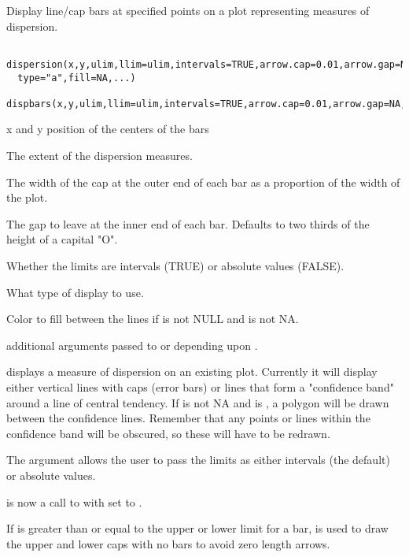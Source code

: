 \begin{Description}\relax
Display line/cap bars at specified points on a plot representing
measures of dispersion.
\end{Description}
\begin{Usage}
\begin{verbatim}
 dispersion(x,y,ulim,llim=ulim,intervals=TRUE,arrow.cap=0.01,arrow.gap=NA,
  type="a",fill=NA,...)
 dispbars(x,y,ulim,llim=ulim,intervals=TRUE,arrow.cap=0.01,arrow.gap=NA,...)
\end{verbatim}
\end{Usage}
\begin{Arguments}
\begin{ldescription}
\item[\code{x,y}] x and y position of the centers of the bars
\item[\code{ulim,llim}] The extent of the dispersion measures.
\item[\code{arrow.cap}] The width of the cap at the outer end of each bar
as a proportion of the width of the plot.
\item[\code{arrow.gap}] The gap to leave at the inner end of each bar.
Defaults to two thirds of the height of a capital "O".
\item[\code{intervals}] Whether the limits are intervals (TRUE) or absolute values
(FALSE).
\item[\code{type}] What type of display to use.
\item[\code{fill}] Color to fill between the lines if  is not NULL and
 is not NA.
\item[\code{...}] additional arguments passed to  or 
depending upon .
\end{ldescription}
\end{Arguments}
\begin{Details}\relax
{} displays a measure of dispersion on an existing plot.
Currently it will display either vertical lines with caps (error bars) or lines
that form a "confidence band" around a line of central tendency. If 
is not NA and  is , a polygon will be drawn between the
confidence lines. Remember that any points or lines within the confidence band
will be obscured, so these will have to be redrawn.

The  argument allows the user to pass the limits as either intervals (the default) or absolute values.

 is now a call to  with  set to
.

If  is greater than or equal to the upper or lower
limit for a bar,  is used to draw the upper and
lower caps with no bars to avoid zero length arrows.
\end{Details}

